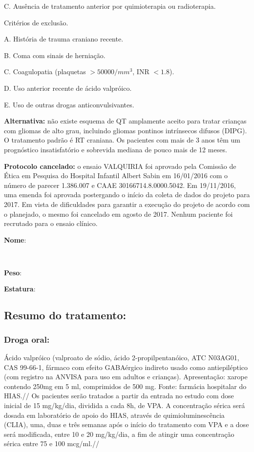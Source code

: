 \documentclass[11pt,a4paper,oldfontcommands]{memoir}
\def\entrywithlabel[#1]#2{\parbox{#1}{{\small #2:} \hrulefill}}
\begin{document}
C. Ausência de tratamento anterior por quimioterapia ou radioterapia.

Critérios de exclusão.

A. História de trauma craniano recente.

B. Coma com sinais de herniação.

C. Coagulopatia (plaquetas $> 50000/mm^3$, INR $< 1.8$).

D. Uso anterior recente de ácido valpróico.

E. Uso de outras drogas anticonvulsivantes.

\textbf{Alternativa:} não existe esquema de QT amplamente aceito para tratar crianças com gliomas de alto grau, incluindo gliomas pontinos intrínsecos difusos (DIPG). O tratamento padrão é RT craniana. Os pacientes com mais de 3 anos têm um prognóstico insatisfatório e sobrevida mediana de pouco mais de 12 meses.

\textbf{Protocolo cancelado:} o ensaio VALQUIRIA foi aprovado pela Comissão de Ética em Pesquisa do Hospital Infantil Albert Sabin em 16/01/2016 com o número de parecer 1.386.007 e CAAE 30166714.8.0000.5042. Em 19/11/2016, uma emenda foi aprovada postergando o início da coleta de dados do projeto para 2017. Em vista de dificuldades para garantir a execução do projeto de acordo com o planejado, o mesmo foi cancelado em agosto de 2017. Nenhum paciente foi recrutado para o ensaio clínico.
 
\pagebreak
    \noindent
\entrywithlabel[1\hsize]{\textbf{Nome}}\hfill
\\[0.3cm]
\entrywithlabel[.45\hsize]{\textbf{Peso}}\hfill  \entrywithlabel[.45\hsize]{\textbf{Estatura}}

\subsection{Resumo do tratamento:}
\subsubsection{Droga oral:}
Ácido valpróico (valproato de sódio, ácido
2-propilpentanóico, ATC N03AG01, CAS 99-66-1, fármaco com efeito
GABAérgico indireto usado como antiepiléptico (com registro na ANVISA
para uso em adultos e crianças). Apresentação: xarope contendo 250mg em
5 ml, comprimidos de 500 mg. Fonte: farmácia hospitalar do HIAS.//
Os pacientes serão tratados a partir da entrada no estudo com dose
inicial de 15 mg/kg/dia, dividida a cada 8h, de VPA. A concentração
sérica será dosada em laboratório de apoio do HIAS, através de
quimioluminescência (CLIA), uma, duas e três semanas após o início do
tratamento com VPA e a dose será modificada, entre 10 e 20 mg/kg/dia, a
fim de atingir uma concentração sérica entre 75 e 100 mcg/ml.//
\end{document}
